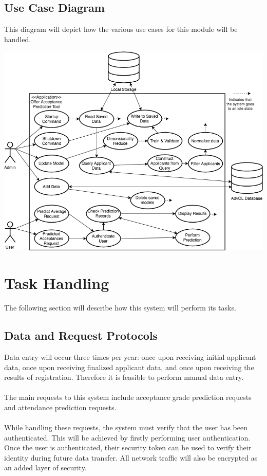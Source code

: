 \documentclass[titlepage]{article}
\begin{document}
\subsection{Use Case Diagram}
This diagram will depict how the various use cases for this module will be handled.
\begin{center}
	\includegraphics[width=\textwidth]{AdvolUseCaseDiagram.png}
\label{fig:use case diagram}
\end{center}



\section{Task Handling}
The following section will describe how this system will perform its tasks.
\subsection{Data and Request Protocols}
Data entry will occur three times per year: once upon receiving initial applicant data, once upon receiving finalized applicant data, and once upon receiving the results of registration. Therefore it is feasible to perform manual data entry.\\~\\
The main requests to this system include acceptance grade prediction requests and attendance prediction requests.\\~\\
While handling these requests, the system must verify that the user has been authenticated. This will be achieved by firstly performing user authentication. Once the user is authenticated, their security token can be used to verify their identity during future data transfer. All network traffic will also be encrypted as an added layer of security.
\end{document}
